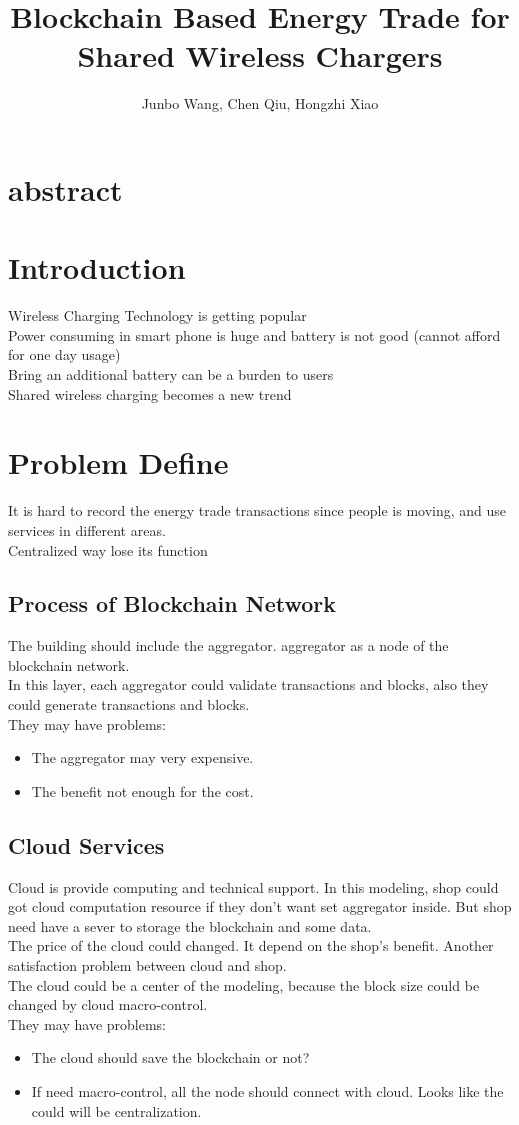 \documentclass[a4paper]{article}
\title{Blockchain Based Energy Trade for Shared Wireless Chargers}
\author{Junbo Wang, Chen Qiu, Hongzhi Xiao}
\begin{document}
\maketitle
\section*{abstract}
\section{Introduction}
Wireless Charging Technology is getting popular\\
 Power consuming in smart phone is huge and battery is not good (cannot afford for one day usage)\\
 Bring an additional battery can be a burden to users\\
 Shared wireless charging becomes a new trend
 
\section{Problem Define}
It is hard to record the energy trade transactions since people is moving, and use services in different areas. \\
Centralized way lose its function 
\subsection{Process of Blockchain Network}
The building should include the aggregator. aggregator as a node of the blockchain network.\\
In this layer, each aggregator could validate transactions and blocks, also they could generate transactions and blocks. \\
They may have problems:\\
\begin{itemize}
	\item The aggregator may very expensive.
	\item The benefit not enough for the cost.
\end{itemize}

\subsection{Cloud Services}
Cloud is provide computing and technical support.
In this modeling, shop could got cloud computation resource if they don’t want set aggregator inside. But shop need have a sever to storage the blockchain and some data.\\
The price of the cloud could changed. It depend on the shop’s benefit. Another satisfaction problem between cloud and shop.\\
The cloud could be a center of the modeling, because the block size could be changed by cloud macro-control. \\
They may have problems:
\begin{itemize}
	\item The cloud should save the blockchain or not?
	\item If need macro-control, all the node should connect with cloud. Looks like the could will be centralization.
\end{itemize}
\end{document}
